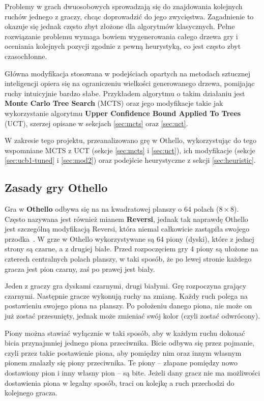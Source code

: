 \documentclass[10pt]{article}
\begin{document}
Problemy w grach dwuosobowych sprowadzają się do znajdowania kolejnych ruchów jednego z graczy, chcąc doprowadzić do jego zwycięstwa. Zagadnienie to okazuje się jednak często zbyt złożone dla algorytmów klasycznych. Pełne rozwiązanie problemu wymaga bowiem wygenerowania całego drzewa gry i oceniania kolejnych pozycji zgodnie z pewną heurystyką, co jest często zbyt czasochłonne.

Główna modyfikacja stosowana w podejściach opartych na metodach sztucznej inteligencji opiera się na ograniczeniu wielkości generowanego drzewa, pomijając ruchy intuicyjnie bardzo słabe. Przykładem algorytmu o takim działaniu jest \textbf{Monte Carlo Tree Search} (MCTS) oraz jego modyfikacje takie jak wykorzystanie algorytmu \textbf{Upper Confidence Bound Applied To Trees} (UCT), szerzej opisane w sekcjach \ref{sec:mcts} oraz \ref{sec:uct}.

W zakresie tego projektu, przeanalizowano grę w Othello, wykorzystując do tego wspomniane MCTS z UCT (sekcje \ref{sec:mcts} i \ref{sec:uct}), ich modyfikacje (sekcje \ref{sec:ucb1-tuned} i \ref{sec:mod2}) oraz podejście heurystyczne z sekcji \ref{sec:heuristic}.

\subsection{Zasady gry Othello}
Gra w \textbf{Othello} odbywa się na na kwadratowej planszy o 64 polach ($8 \times 8$). Często nazywana jest również mianem \textbf{Reversi}, jednak tak naprawdę Othello jest szczególną modyfikacją Reversi, która niemal całkowicie zastąpiła swojego przodka~\cite{Othello}. W grze w Othello wykorzystywane są 64 piony (dyski), które z jednej strony są czarne, a z drugiej białe. Przed rozpoczęciem gry 4 piony są ułożone na czterech centralnych polach planszy, w taki sposób, że po lewej stronie każdego gracza jest pion czarny, zaś po prawej jest biały.

Jeden z graczy gra dyskami czarnymi, drugi białymi. Grę rozpoczyna grający czarnymi. Następnie gracze wykonują ruchy na zmianę. Każdy ruch polega na postawieniu swojego piona na planszy. Po położeniu danego piona, nie może on już zostać przesunięty, jednak może zmieniać swój kolor (czyli zostać odwrócony).

Piony można stawiać wyłącznie w taki sposób, aby w każdym ruchu dokonać bicia przynajmniej jednego piona przeciwnika. Bicie odbywa się przez pojmanie, czyli przez takie postawienie piona, aby pomiędzy nim oraz innym własnym pionem znalazły się piony przeciwnika. Te piony – złapane pomiędzy nowo dostawiony pion i inny własny pion – są bite. Jeżeli dany gracz nie ma możliwości dostawienia piona w legalny sposób, traci on kolejkę a ruch przechodzi do kolejnego gracza.
\end{document}
